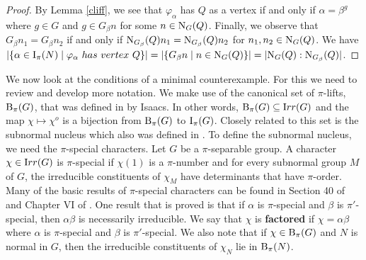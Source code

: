 \documentclass[12pt]{article}
\newtheorem{lemma}[theorem]{Lemma}
\def\irr#1{{\textrm  Irr}(#1)}
\def\norm#1#2{{\textrm N}_{#1} (#2)}
\def\B#1#2{{\textrm B}_{#1} (#2)}
\def\Bpi#1{\B {\pi}{#1}}
\def\I#1#2{{\textrm I}_{#1} (#2)}
\def\Ipi#1{\I {\pi}{#1}}
\def\phi{\varphi}
\begin{document}
\begin{proof}
By Lemma \ref{cliff}, we see that $\phi_\alpha$ has $Q$ as a vertex
if and only if $\alpha = \beta^g$ where $g \in G$ and $g \in G_\beta
n$ for some $n \in \norm GQ$. Finally, we observe that $G_\beta n_1
= G_\beta n_2$ if and only if $\norm {G_\beta}Q n_1 = \norm
{G_\beta}Q n_2$ for $n_1, n_2 \in \norm GQ$.  We have $|\{ \alpha
\in \Ipi N \mid \phi_\alpha {\textrm ~ has~vertex~} Q \}| = | \{ G_\beta
n \mid n \in \norm GQ \} | = |\norm GQ :\norm {G_\beta}Q|$.
\end{proof}

We now look at the conditions of a minimal counterexample.  For this
we need to review and develop more notation.  We make use of the
canonical set of $\pi$-lifts, $\Bpi G$, that was defined in
\cite{pisep} by Isaacs.  In other words, $\Bpi G \subseteq \irr G$
and the map $\chi \mapsto \chi^o$ is a bijection from $\Bpi G$ to
$\Ipi G$.  Closely related to this set is the subnormal nucleus
which also was defined in \cite{pisep}.  To define the subnormal
nucleus, we need the $\pi$-special characters.  Let $G$ be a
$\pi$-separable group.  A character $\chi \in \irr G$ is
$\pi$-special if $\chi (1)$ is a $\pi$-number and for every
subnormal group $M$ of $G$, the irreducible constituents of $\chi_M$
have determinants that have $\pi$-order.  Many of the basic results
of $\pi$-special characters can be found in Section 40 of
\cite{hupte} and Chapter VI of \cite{Mawo}. One result that is
proved is that if $\alpha$ is $\pi$-special and $\beta$ is
$\pi'$-special, then $\alpha \beta$ is necessarily irreducible. We
say that $\chi$ is {\bf factored} if $\chi = \alpha \beta$ where
$\alpha$ is $\pi$-special and $\beta$ is $\pi'$-special.  We also
note that if $\chi \in \Bpi G$ and $N$ is normal in $G$, then the
irreducible constituents of $\chi_N$ lie in $\Bpi N$.



\end{document}
